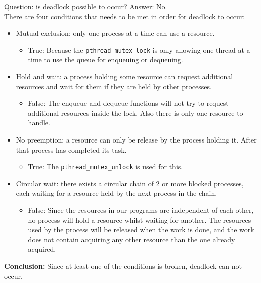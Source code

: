 \documentclass[a4paper,11pt,twoside,fleqn]{article}
\begin{document}
Question: is deadlock possible to occur? Answer: No.
\\
There are four conditions that needs to be met in order for deadlock to occur:
\begin{itemize}

\item
Mutual exclusion: only one process at a time can use a resource.
\begin{itemize} \item True: Because the \verb+pthread_mutex_lock+ is only allowing one thread at a time to use the queue for enqueuing or dequeuing.
\end{itemize}

\item Hold and wait: a process holding some resource can request additional resources and wait for them if they are held by other processes.
\begin{itemize}
\item False: The enqueue and dequeue functions will not try to request additional resources inside the lock. Also there is only one resource to handle.
\end{itemize}

\item No preemption: a resource can only be release by the process holding it. After that process has completed its task.
\begin{itemize}
\item True: The \verb+pthread_mutex_unlock+ is used for this.
\end{itemize} 

\item Circular wait: there exists a circular chain of 2 or more blocked processes, each waiting for a resource held by the next process in the chain.
\begin{itemize}
\item False: Since the resources in our programs are independent of each other, no process will hold a resource whilst waiting for another. The resources used by the process will be released when the work is done, and the work does not contain acquiring any other resource than the one already acquired.
\end{itemize}

\end{itemize}

\textbf{Conclusion:} Since at least one of the conditions is broken, deadlock can not occur.

\clearpage
\end{document}
